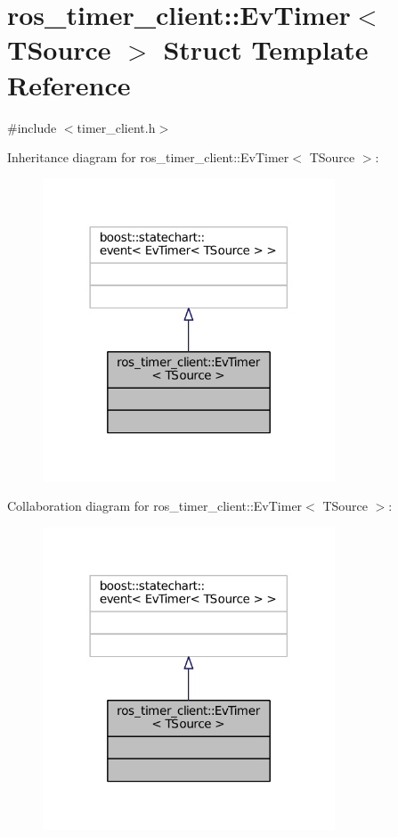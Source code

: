 \hypertarget{structros__timer__client_1_1EvTimer}{}\section{ros\+\_\+timer\+\_\+client\+:\+:Ev\+Timer$<$ T\+Source $>$ Struct Template Reference}
\label{structros__timer__client_1_1EvTimer}


{\ttfamily \#include $<$timer\+\_\+client.\+h$>$}



Inheritance diagram for ros\+\_\+timer\+\_\+client\+:\+:Ev\+Timer$<$ T\+Source $>$\+:
\nopagebreak
\begin{figure}[H]
\begin{center}
\leavevmode
\includegraphics[width=246pt]{structros__timer__client_1_1EvTimer__inherit__graph}
\end{center}
\end{figure}


Collaboration diagram for ros\+\_\+timer\+\_\+client\+:\+:Ev\+Timer$<$ T\+Source $>$\+:
\nopagebreak
\begin{figure}[H]
\begin{center}
\leavevmode
\includegraphics[width=246pt]{structros__timer__client_1_1EvTimer__coll__graph}
\end{center}
\end{figure}


